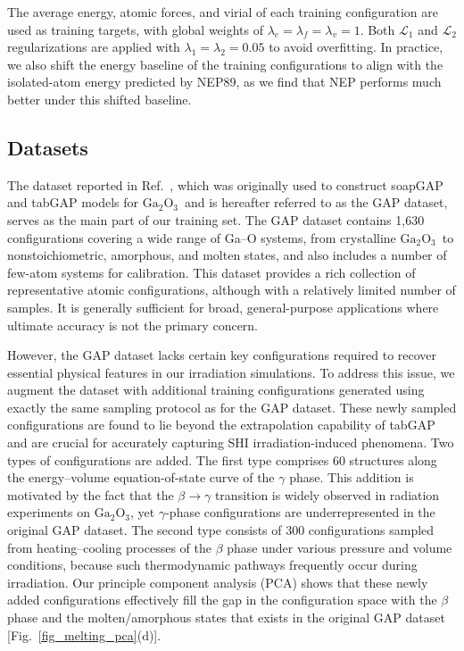 \documentclass[aip,graphicx,amsmath,amssymb]{revtex4-1}
\newcommand{\ga}{$\text{Ga}_2\text{O}_3$}
\begin{document}
The average energy, atomic forces, and virial of each training configuration are used as training targets, 
with global weights of $\lambda_e=\lambda_f=\lambda_v=1$. 
Both $\mathcal{L}_1$ and $\mathcal{L}_2$ regularizations are applied with $\lambda_1=\lambda_2=0.05$ to 
avoid overfitting.\cite{fan_gpumd_2022} 
In practice, we also shift the energy baseline of the training configurations to align with the 
isolated-atom energy predicted by NEP89\cite{liang_nep89_2025}, as we find that NEP performs much 
better under this shifted baseline. 

\subsection{Datasets}

The dataset reported in Ref.~, which was originally used to construct 
soapGAP and tabGAP models for \ga\ and is hereafter referred to as the GAP dataset, 
serves as the main part of our training set.
The GAP dataset contains 1,630 configurations covering a wide range of Ga--O systems, 
from crystalline \ga\ to nonstoichiometric, amorphous, and molten states, 
and also includes a number of few-atom systems for calibration.
This dataset provides a rich collection of representative atomic configurations, although with 
a relatively limited number of samples. 
It is generally sufficient for broad, general-purpose applications where ultimate accuracy 
is not the primary concern.

However, the GAP dataset lacks certain key configurations required 
to recover essential physical features in our irradiation simulations. 
To address this issue, we augment the dataset with additional training configurations generated 
using exactly the same sampling protocol as for the GAP dataset.
These newly sampled configurations are found to lie beyond the extrapolation capability of tabGAP 
and are crucial for accurately capturing SHI irradiation-induced phenomena.
Two types of configurations are added. 
The first type comprises 60 structures along the energy--volume 
equation-of-state curve of the $\gamma$ phase. 
This addition is motivated by the fact that 
the $\beta \to \gamma$ transition is widely observed in radiation experiments on \ga,\cite{zhao_crystallization_2025,han_electronic_2025,abdullaev_ions_2025} 
yet $\gamma$-phase configurations are underrepresented in the original GAP dataset. 
The second type consists of 300 configurations sampled from heating--cooling processes 
of the $\beta$ phase under various pressure and volume conditions,
because such thermodynamic pathways frequently occur during irradiation.
Our principle component analysis (PCA) shows that these newly added configurations 
effectively fill the gap in the configuration space with the $\beta$ phase 
and the molten/amorphous states that exists in the original GAP dataset [Fig.~\ref{fig_melting_pca}(d)].
\end{document}
